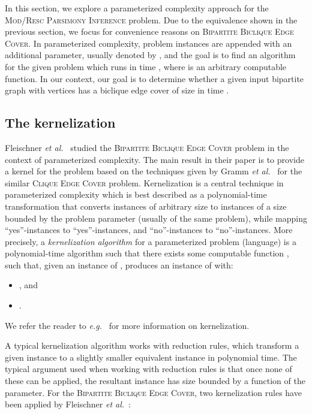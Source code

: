 

In this section, we explore a parameterized complexity approach
\cite{DowneyFellows1999,FlumGrohe2006,Niedermeier2006} for the
\textsc{Mod/Resc Parsimony Inference} problem. Due to the equivalence shown in the previous section, we focus
for convenience reasons on \textsc{Bipartite Biclique Edge
Cover}. In parameterized
complexity, problem instances are appended with an additional
parameter, usually denoted by , and the goal is to find an
algorithm for the given problem which runs
in time , where  is an arbitrary
computable function. In our context, our goal is to determine
whether a given input bipartite graph  with  vertices
has a biclique edge cover of size  in time .

\subsection{The kernelization}\label{s:sskern}

Fleischner \emph{et
al.}~\cite{FleischnerMujuniPaulusmaSzeider2009} studied the
\textsc{Bipartite Biclique Edge Cover} problem in the context
of parameterized complexity. The main result in their paper is to
provide a kernel for the problem based on the techniques given
by Gramm \emph{et al.}~\cite{GrammGuoHuffnerNiedermeier2006}
for the similar \textsc{Clique Edge Cover} problem.
Kernelization is a central technique in parameterized
complexity which is best described as a polynomial-time
transformation that converts instances of arbitrary size to
instances of a size bounded by the problem parameter (usually of
the same problem), while mapping ``yes''-instances to
``yes''-instances, and ``no''-instances to ``no''-instances. More
precisely, a \emph{kernelization algorithm}  for a
parameterized problem (language)  is a polynomial-time
algorithm such that there exists some computable function
, such that, given an instance  of , 
produces an instance  of  with:
\begin{itemize}
\item , and
\item .
\end{itemize}

We refer the reader to
\emph{e.g.}~\cite{GuoNiedermeier2007,Niedermeier2006} for more
information on kernelization.

A typical kernelization algorithm works with reduction rules,
which transform a given instance to a slightly smaller
equivalent instance in polynomial time. The typical argument
used when working with reduction rules is that once none of
these can be applied, the resultant instance has size bounded
by a function of the parameter. For the \textsc{Bipartite
Biclique Edge Cover}, two kernelization rules have been applied
by Fleischner \emph{et
al.}~\cite{FleischnerMujuniPaulusmaSzeider2009}:\\

